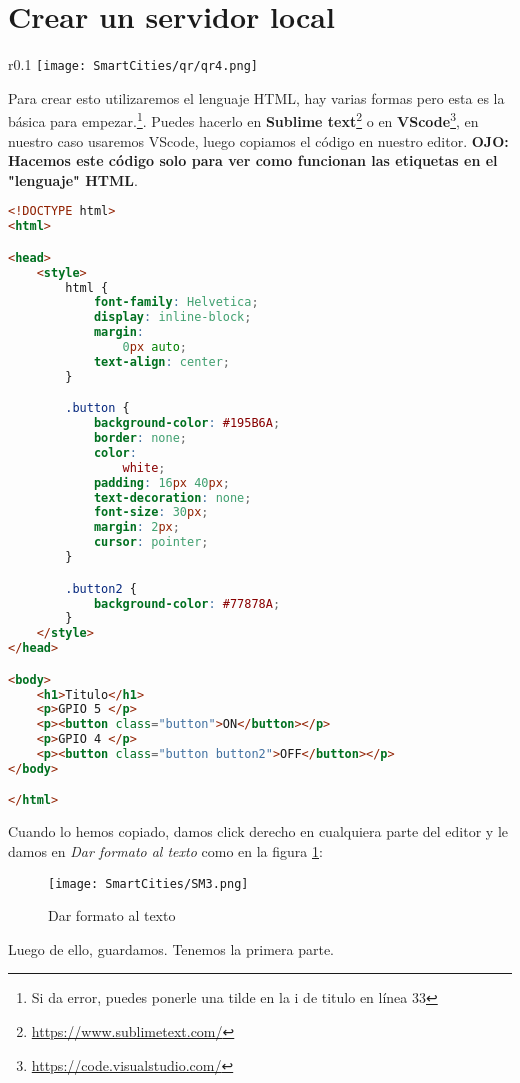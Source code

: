 \documentclass[
	12pt, %
	fleqn, %
	a4paper, %
]{LegrandOrangeBook}
\begin{document}
\section{Crear un servidor local}
\begin{wrapfigure}{r}{0.1\linewidth}
\centering\texttt{[image: SmartCities/qr/qr4.png]}
\caption{QR program: 4.Server local On Off led}
\label{fig:qr4}
\end{wrapfigure}
Para crear esto utilizaremos el lenguaje HTML, hay varias formas pero esta es la básica para empezar.\footnote{Si da error, puedes ponerle una tilde en la i de titulo en línea 33}. Puedes hacerlo en \textbf{Sublime text}\footnote{\url{https://www.sublimetext.com/}} o en \textbf{VScode}\footnote{\url{https://code.visualstudio.com/}}, en nuestro caso usaremos VScode, luego copiamos el código en nuestro editor. \textbf{OJO: Hacemos este código solo para ver como funcionan las etiquetas en el "lenguaje" HTML}.
\begin{lstlisting}[language=html, caption={Conectarse a una red WiFi},captionpos=b,frame=single]
<!DOCTYPE html>
<html>

<head>
    <style>
        html {
            font-family: Helvetica;
            display: inline-block;
            margin:
                0px auto;
            text-align: center;
        }

        .button {
            background-color: #195B6A;
            border: none;
            color:
                white;
            padding: 16px 40px;
            text-decoration: none;
            font-size: 30px;
            margin: 2px;
            cursor: pointer;
        }

        .button2 {
            background-color: #77878A;
        }
    </style>
</head>

<body>
    <h1>Titulo</h1>
    <p>GPIO 5 </p>
    <p><button class="button">ON</button></p>
    <p>GPIO 4 </p>
    <p><button class="button button2">OFF</button></p>
</body>

</html>
\end{lstlisting}
Cuando lo hemos copiado, damos click derecho en cualquiera parte del editor y le damos en \textit{Dar formato al texto} como en la figura \ref{fig:VSformato}:
\begin{figure}[h]
\centering\texttt{[image: SmartCities/SM3.png]}
\caption{Dar formato al texto}
\label{fig:VSformato}
\end{figure}
Luego de ello, guardamos. Tenemos la primera parte.
\end{document}
